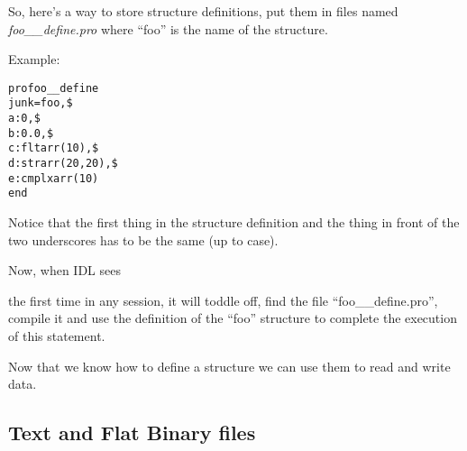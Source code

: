   So, here's a way to store structure definitions, put them
  in files named \textit{foo\_\_define.pro} where ``foo''
  is the name of the structure.  

  Example:

\begin{alltt}
pro foo__define
  junk = { foo, \$
           a: 0, \$
           b: 0.0, \$
           c:fltarr(10), \$
           d:strarr(20,20), \$
           e:cmplxarr(10) }
end
\end{alltt}

  Notice that the first thing in the structure definition and the
  thing in front of the two underscores has to be the same (up to
  case).

  Now, when IDL sees 


  the first time in any session, it will toddle off, find the file
  ``foo\_\_define.pro'', compile it and use the definition of the
  ``foo'' structure to complete the execution of this statement.

  Now that we know how to define a structure we can use them to read
  and write data.

\subsection{Text and Flat Binary files}



